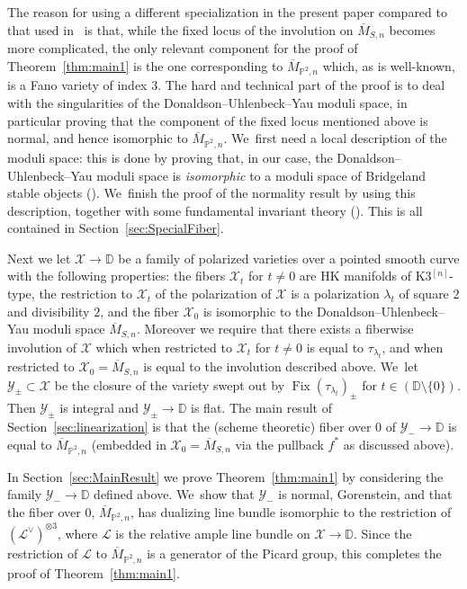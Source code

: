 \documentclass[JEP,XML,SOM,Unicode,published]{cedram}
\newcommand{\HK}{\textup{HK}\xspace}
\newcommand{\DD}{{\mathbb D}}
\newcommand{\PP}{{\mathbb P}}\let\P\PP
\newcommand\cL{\mathcal{L}}
\newcommand\cX{\mathcal{X}}
\newcommand\cY{\mathcal{Y}}
\DeclareMathOperator{\Fix}{Fix}
\let\ov\overline
\theoremstyle{definition}
\begin{document}
The reason for using a different specialization in the present paper compared to that used in~\cite{involutions1} is that, while the fixed locus of the involution on $\ov{M}_{S,n}$ becomes more complicated, the only relevant component for the proof of Theorem~\ref{thm:main1} is the one corresponding to $\ov{M}_{\PP^2,n}$ which, as is well-known, is a Fano variety of index $3$.
The hard and technical part of the proof is to deal with the singularities of the Donaldson--Uhlenbeck--Yau moduli space, in particular proving that the component of the fixed locus mentioned above is normal, and hence isomorphic to $\ov{M}_{\PP^2,n}$. We~first need a local description of the moduli space: this is done by proving that, in our case, the Donaldson--Uhlenbeck--Yau moduli space is \emph{isomorphic} to a moduli space of Bridgeland stable objects (\cite{Bridgeland:Stab,Tajakka:Uhlenbeck}). We~finish the proof of the normality result by using this description, together with some fundamental invariant theory (\cite{procesi:invariants}).
This is all contained in Section~\ref{sec:SpecialFiber}.

Next we let $\cX\to\DD$ be a family of polarized varieties over a pointed smooth curve with the following properties: the fibers $\cX_t$ for $t\not=0$ are \HK manifolds of K3$^{[n]}$-type, the restriction to $\cX_t$ of the polarization of $\cX$ is a polarization $\lambda_t$ of square $2$ and divisibility $2$, and the fiber $\cX_0$ is isomorphic to the Donaldson--Uhlenbeck--Yau moduli space $\ov{M}_{S,n}$.
Moreover we require that there exists a fiberwise involution of $\cX$ which when restricted to $\cX_t$ for $t\not=0$ is equal to $\tau_{\lambda_t}$, and when restricted to $\cX_0=\ov{M}_{S,n}$ is equal to the involution described above. We~let $\cY_{\pm}\subset\cX$ be the closure of the variety swept out by $\Fix(\tau_{\lambda_t})_{\pm}$ for $t\in(\DD\setminus\{0\})$.
Then $\cY_{\pm}$ is integral and $\cY_{\pm}\to\DD$ is flat.
The main result of Section~\ref{sec:linearization} is that the (scheme theoretic) fiber over $0$ of $\cY_{-}\to\DD$ is equal to $\ov{M}_{\PP^2,n}$ (embedded in $\cX_0=\ov{M}_{S,n}$ via the pullback $f^*$ as discussed above).

In Section~\ref{sec:MainResult} we prove Theorem~\ref{thm:main1} by considering the family $\cY_{-}\to\DD$ defined above. We~show that $\cY_{-}$ is normal, Gorenstein, and that the fiber over $0$, \ie $\ov{M}_{\PP^2,n}$, has dualizing line bundle isomorphic to the restriction of $(\cL^{\vee})^{\otimes 3}$, where $\cL$ is the relative ample line bundle on $\cX\to\DD$.
Since the restriction of $\cL$ to $\ov{M}_{\PP^2,n}$ is a generator of the Picard group, this completes the proof of Theorem~\ref{thm:main1}.
\end{document}
